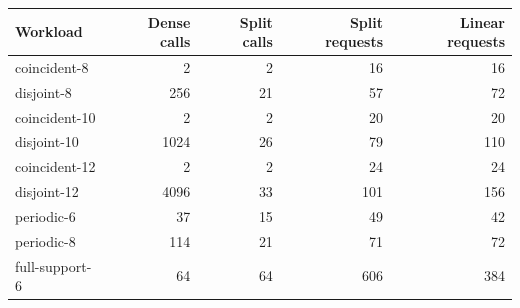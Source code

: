 \begin{tabular}{lrrrr}
\toprule
Workload & Dense calls & Split calls & Split requests & Linear requests\\
\midrule
coincident-8 & 2 & 2 & 16 & 16\\
disjoint-8 & 256 & 21 & 57 & 72\\
coincident-10 & 2 & 2 & 20 & 20\\
disjoint-10 & 1024 & 26 & 79 & 110\\
coincident-12 & 2 & 2 & 24 & 24\\
disjoint-12 & 4096 & 33 & 101 & 156\\
periodic-6 & 37 & 15 & 49 & 42\\
periodic-8 & 114 & 21 & 71 & 72\\
full-support-6 & 64 & 64 & 606 & 384\\
\bottomrule
\end{tabular}
